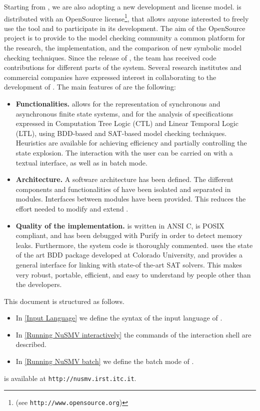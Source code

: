 Starting from \nusmvTwo, we are also adopting a new development and
license model. \nusmvTwo is distributed with an OpenSource
license\footnote{(see \texttt{http://www.opensource.org})}, that
allows anyone interested to freely use the tool and to participate in
its development. The aim of the \nusmv OpenSource project is to
provide to the model checking community a common platform for the
research, the implementation, and the comparison of new symbolic model
checking techniques. Since the release of \nusmvTwo, the \nusmv team
has received code contributions for different parts of the system.
Several research institutes and commercial companies have expressed
interest in collaborating to the development of \nusmv. The main
features of \nusmv are the following:
\begin{itemize}
\item {\bf Functionalities.}
\nusmv allows for the representation of synchronous and
asynchronous finite state systems, and for the analysis of
specifications expressed in Computation Tree Logic (CTL) and Linear
Temporal Logic (LTL), using BDD-based and SAT-based model checking techniques.
Heuristics are available for achieving efficiency and partially
controlling the state explosion.  The interaction with the user can be
carried on with a textual interface, as well as in batch mode.
\item{\bf Architecture.}
A software architecture has been defined. The different components and
functionalities of \nusmv have been isolated and separated in
modules. Interfaces between modules have been provided. This 
reduces the effort needed to modify and extend \nusmv.
\item{\bf Quality of the implementation.}
\nusmv is written in ANSI C, is POSIX compliant, and has been
debugged with Purify in order to detect memory leaks. Furthermore, the
system code is thoroughly commented. \nusmv uses the state of the
art BDD package developed at Colorado University, and provides a general
interface for linking with state-of the-art SAT solvers. This makes
\nusmv very robust, portable, efficient, and easy to
understand by people other than the developers.
\end{itemize}
This document is structured as follows.
\begin{itemize}
\item In \cref{Input Language} we define the syntax of the input language of
\nusmv.
\item In \cref{Running NuSMV interactively} the commands of the
interaction shell are described.
\item In \cref{Running NuSMV batch}
we define the batch mode of \nusmv.
\end{itemize}
\nusmv is available at \texttt{http://nusmv.irst.itc.it}.
